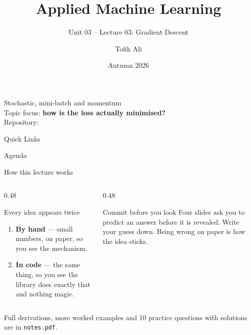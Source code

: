 \documentclass[aspectratio=169]{beamer}
\title[Applied Machine Learning]{Applied Machine Learning}
\subtitle{Unit 03 -- Lecture 03: Gradient Descent}
\author{Tofik Ali}
\institute{School of Computer Science, UPES Dehradun}
\date{Autumn 2026}
\begin{document}
\UPESCoverFrame
\setcounter{framenumber}{0}

\begin{frame}
  \titlepage
  \vspace{0.3em}
  \begin{center}
    \footnotesize Stochastic, mini-batch and momentum\\[0.25em]
    \footnotesize Topic focus: \textbf{how is the loss actually minimised?}\\[0.25em]
    \footnotesize Repository: \texttt{\AMLRepoURL}
  \end{center}
  \slidesources{\AMLUnitIIISources}
\end{frame}

\begin{frame}{Quick Links}
  \centering
  \hyperlink{sec:gd}{}\hspace{0.5em}
  \hyperlink{sec:lr}{}\hspace{0.5em}
  \hyperlink{sec:sgd}{}\hspace{0.5em}
  \hyperlink{sec:mini}{}\hspace{0.5em}
  \hyperlink{sec:mom}{}\hspace{0.5em}
  \hyperlink{sec:summary}{}
\end{frame}

\begin{frame}{Agenda}
  \tableofcontents
\end{frame}

\begin{frame}{How this lecture works}
  \begin{columns}[T]
    \begin{column}{0.48\textwidth}
      \begin{block}{Every idea appears twice}
        \begin{enumerate}
          \item \textbf{By hand} --- small numbers, on paper, so you see the
            mechanism.
          \item \textbf{In code} --- the same thing, so you see the library does
            exactly that and nothing magic.
        \end{enumerate}
      \end{block}
    \end{column}
    \begin{column}{0.48\textwidth}
      \begin{alertblock}{Commit before you look}
        Four slides ask you to predict an answer before it is revealed. Write
        your guess down. Being wrong on paper is how the idea sticks.
      \end{alertblock}
    \end{column}
  \end{columns}
  \vspace{0.4em}
  \begin{center}
    \small Full derivations, more worked examples and 10 practice questions
    with solutions are in \texttt{notes.pdf}.
  \end{center}
\end{frame}
\end{document}
